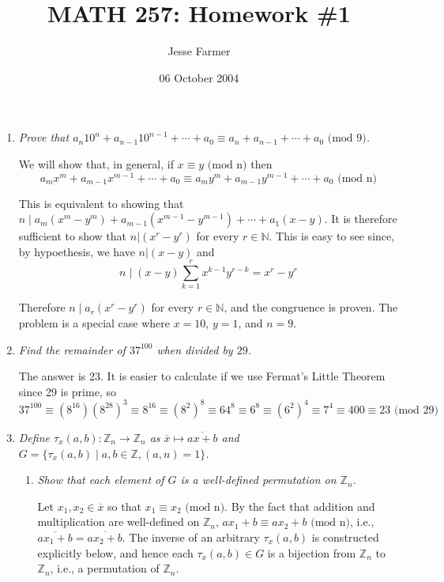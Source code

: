 \documentclass[letterpaper, 11pt]{article}
\title{MATH 257: Homework \#1}
\author{Jesse Farmer}
\date{06 October 2004}
\begin{document}
\maketitle
\begin{enumerate}

\item \emph{Prove that $a_n10^n + a_{n-1}10^{n-1} + \cdots + a_0 \equiv a_n + a_{n-1} + \cdots + a_0 \mbox{ (mod 9)}$.}

We will show that, in general, if $x \equiv y \mbox{ (mod n)}$ then 
\[
	a_mx^m + a_{m-1}x^{m-1} + \cdots + a_0 \equiv a_my^m + a_{m-1}y^{m-1} + \cdots + a_0 \mbox{ (mod n)}
\]

This is equivalent to showing that $n \mid a_m(x^m - y^m) + a_{m-1}(x^{m-1} - y^{m-1}) + \cdots + a_1(x-y)$.  It is therefore sufficient to show that $n | (x^r - y^r)$ for every $r \in \mathbb{N}$.  This is easy to see since, by hypoethesis, we have $n | (x-y)$ and
\[
n \mid (x-y)\sum_{k=1}^{r} x^{k-1}y^{r-k} = x^r - y^r
\]

Therefore $n \mid a_r(x^r - y^r)$ for every $r \in \mathbb{N}$, and the congruence is proven.  The problem is a special case where $x=10$, $y=1$, and $n=9$.

\item \emph{Find the remainder of $37^{100}$ when divided by $29$.}

The answer is $23$.  It is easier to calculate if we use Fermat's Little Theorem since 29 is prime, so
\[
37^{100} \equiv (8^{16})(8^{28})^3 \equiv 8^{16} \equiv  (8^2)^8 \equiv 64^{8} \equiv 6^8 \equiv (6^2)^4 \equiv 7^4 \equiv 400 \equiv 23 \mbox { (mod 29)}
\]

\item \emph{Define $\tau_x(a,b): \mathbb{Z}_n \rightarrow \mathbb{Z}_n$ as $\overline{x} \mapsto \overline{ax+b}$ and $G = \{\tau_x(a,b) \mid a,b \in \mathbb{Z}, (a,n)=1\}$.}
\begin{enumerate} 
\item \emph{Show that each element of $G$ is a well-defined permutation on $\mathbb{Z}_n$.}

Let $x_1, x_2 \in \overline{x}$ so that $x_1 \equiv x_2 \mbox{ (mod n)}$.  By the fact that addition and multiplication are well-defined on $\mathbb{Z}_n$, $ax_1+b \equiv ax_2+b \mbox{ (mod n)}$, i.e., $\overline{ax_1+b} = \overline{ax_2+b}$.  The inverse of an arbitrary $\tau_x(a,b)$ is constructed explicitly below, and hence each $\tau_x(a,b) \in G$ is a bijection from $\mathbb{Z}_n$ to $\mathbb{Z}_n$, i.e., a permutation of $\mathbb{Z}_n$.
 

\end{enumerate}
\end{enumerate}
\end{document}

